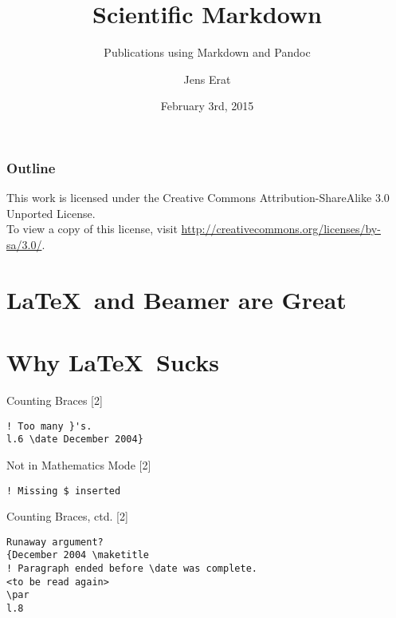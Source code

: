 \documentclass[smaller,ignorenonframetext,]{beamer}
\title{Scientific Markdown}
\subtitle{Publications using Markdown and Pandoc}
\author{Jens Erat}
\date{February 3rd, 2015}
\begin{document}
\frame{\titlepage}


\begin{frame}[t]

\frametitle{Outline}


\tableofcontents[hideallsubsections]

\vspace*{2em}

\begin{center}


\scriptsize This work is licensed under the Creative Commons
Attribution-ShareAlike 3.0 Unported License.\\ To view a copy
of this license, visit
\url{http://creativecommons.org/licenses/by-sa/3.0/}.

\end{center}
\end{frame}

\section{\LaTeX~and Beamer are Great}\label{and-beamer-are-great}

\section{Why \LaTeX~Sucks}\label{why-sucks}

\begin{frame}[fragile]{Counting Braces {[}2{]}}

\begin{lstlisting}
! Too many }'s.
l.6 \date December 2004}
\end{lstlisting}

\end{frame}

\begin{frame}[fragile]{Not in Mathematics Mode {[}2{]}}

\begin{lstlisting}
! Missing $ inserted
\end{lstlisting}

\end{frame}

\begin{frame}[fragile]{Counting Braces, ctd. {[}2{]}}

\begin{lstlisting}
Runaway argument?
{December 2004 \maketitle
! Paragraph ended before \date was complete.
<to be read again>
\par
l.8
\end{lstlisting}

\end{frame}
\end{document}
